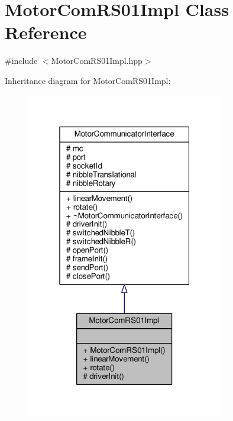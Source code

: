 \hypertarget{class_motor_com_r_s01_impl}{}\section{Motor\+Com\+R\+S01\+Impl Class Reference}
\label{class_motor_com_r_s01_impl}


{\ttfamily \#include $<$Motor\+Com\+R\+S01\+Impl.\+hpp$>$}



Inheritance diagram for Motor\+Com\+R\+S01\+Impl\+:\nopagebreak
\begin{figure}[H]
\begin{center}
\leavevmode
\includegraphics[width=244pt]{class_motor_com_r_s01_impl__inherit__graph}
\end{center}
\end{figure}


